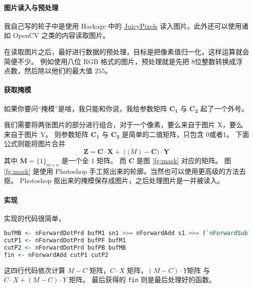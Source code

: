 \paragraph{图片读入与预处理}
我自己写的轮子中是使用 Hackage 中的 \href{http://hackage.haskell.org/package/JuicyPixels}{JuicyPixels}
读入图片。此外还可以使用诸如 OpenCV 之类的内容读取图片。

在读取图片之后，最好进行数据的预处理，目标是把像素值归一化，这样运算就会简便不少。
例如使用八位 RGB 格式的图片，预处理就是先把 8位整数转换成浮点数，然后除以他们的最大值 $255$。

\paragraph{获取掩模}
如果你要问“掩模”是啥，我只能和你说，我给参数矩阵 $\mathbf{C_1}$ 与 $\mathbf{C_2}$ 起了一个外号。

我们需要将两张图片的部分进行组合，对于一个像素，要么来自于图片 X，要么来自于图片 Y。
则参数矩阵 $\mathbf{C_1}$ 与 $\mathbf{C_2}$ 是简单的二值矩阵，只包含 0或者1。
下面公式则能将图片合并
\[
    \mathbf{Z} = \mathbf{C} \cdot \mathbf{X} + (\mathbf(M) - \mathbf{C}) \cdot \mathbf{Y}
\]
其中 $\mathbf{M} = \{1\}_{m \times n}$ 是一个全 $1$ 矩阵。
而 $\mathbf{C}$ 是图 \ref{fg:mask} 对应的矩阵。
图 \ref{fg:mask} 是使用 Photoshop 手工抠出来的轮廓。当然也可以使用更高级的方法去抠。
Photoshop 抠出来的掩模保存成图片，之后处理图片是一并被读入。

\paragraph{实现}
实现的代码很简单，
\begin{lstlisting}[language=Haskell]
bufMB <- nForwardDotPrd bufM1 sn1 >>= nForwardAdd s1 >>= (`nForwardSub` bufM2)
cutP1 <- nForwardDotPrd bufPF bufM1
cutP2 <- nForwardDotPrd bufPB bufMB
fin <- nForwardAdd cutP1 cutP2
\end{lstlisting}
这四行代码依次计算 $M-C$ 矩阵，$C \cdot X$ 矩阵，$(M - C) \cdot Y$矩阵 与 $C \cdot X + (M - C) \cdot Y$ 矩阵。
最后获得的 \verb|fin| 则是最后处理好的函数。
